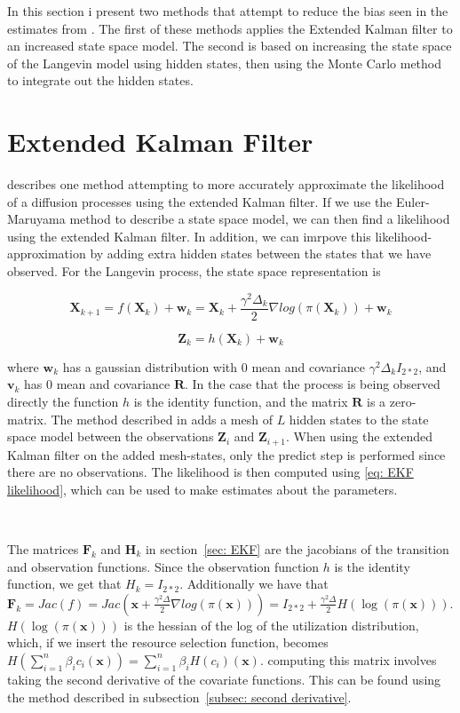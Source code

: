
\label{chap: methods}
In this section i present two methods that attempt to reduce the bias seen in the estimates from \cite{michelot_langevin_2019}. The first of these methods applies the Extended Kalman filter to an increased state space model. The second is based on increasing the state space of the Langevin model using hidden states, then using the Monte Carlo method to integrate out the hidden states. 

\section{Extended Kalman Filter}
\parencite{kulikov_extended_2024} describes one method attempting to more accurately approximate the likelihood of a diffusion processes using the extended Kalman filter. If we use the Euler-Maruyama method to describe a state space model, we can then find a likelihood using the extended Kalman filter. In addition, we can imrpove this likelihood-approximation by adding extra hidden states between the states that we have observed. For the Langevin process, the state space representation is 

$$\textbf{X}_{k+1} = f(\textbf{X}_k) + \textbf{w}_k = \textbf{X}_k + \frac{\gamma^2\Delta_k}{2}\nabla log(\pi(\textbf{X}_k)) + \textbf{w}_k$$

$$\textbf{Z}_k = h(\textbf{X}_k) + \textbf{w}_k$$

where $\textbf{w}_k$ has a gaussian distribution with $0$ mean and covariance $\gamma^2\Delta_k I_{2*2}$, and $\textbf{v}_k$ has $0$ mean and covariance $\textbf{R}$. In the case that the process is being observed directly the function $h$ is the identity function, and the matrix $\textbf{R}$ is a zero-matrix. The method described in \parencite{kulikov_extended_2024} adds a mesh of $L$ hidden states to the state space model between the observations $\textbf{Z}_i$ and $\textbf{Z}_{i+1}$. When using the extended Kalman filter on the added mesh-states, only the predict step is performed since there are no observations. The likelihood is then computed using \eqref{eq: EKF likelihood}, which can be used to make estimates about the parameters. 

\

The matrices $\textbf{F}_k$ and $\textbf{H}_k$ in section~\ref{sec: EKF} are the jacobians of the transition and observation functions. Since the observation function $h$ is the identity function, we get that $H_k = I_{2*2}$. Additionally we have that $\textbf{F}_k = Jac(f) = Jac(\textbf{x} + \frac{\gamma^2 \Delta}{2}\nabla log(\pi(\textbf{x}))) = I_{2*2} + \frac{\gamma^2 \Delta}{2} H(\log(\pi(\textbf{x})))$. $H(\log(\pi(\textbf{x})))$ is the hessian of the log of the utilization distribution, which, if we insert the resource selection function, becomes $H(\sum_{i=1}^n \beta_i c_i(\textbf{x})) = \sum_{i=1}^n \beta_iH( c_i)(\textbf{x})$. computing this matrix involves taking the second derivative of the covariate functions. This can be found using the method described in subsection~\ref{subsec: second derivative}.


